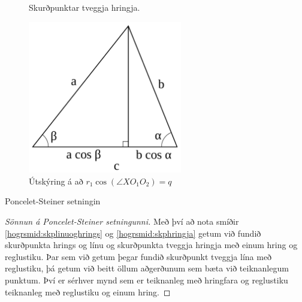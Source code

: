 \begin{frame}
  \begin{figure}[H]
    \centering
    \caption{Skurðpunktar tveggja hringja.}
    \label{fig:hogrskptveggjahringja}
  \end{figure}
\end{frame}

\begin{frame}
  \begin{figure}[H]
    \centering
    \includegraphics[width=0.6\textwidth]{AcuteAngle.png}
    \caption{Útskýring á að \(r_1 \cos{(\angle XO_1O_2)} = q \)}
    \label{fig:acuteangle}
  \end{figure}
\end{frame}

\begin{frame}{Poncelet-Steiner setningin}
  \begin{proof}[Sönnun á Poncelet-Steiner setningunni]
    Með því að nota smíðir \ref{hogrsmid:skplinuoghrings} og \ref{hogrsmid:skphringja}
    getum við fundið skurðpunkta hrings og línu og skurðpunkta
    tveggja hringja með einum hring og reglustiku. Þar sem við getum þegar
    fundið skurðpunkt tveggja lína með reglustiku, þá getum við  beitt öllum
    aðgerðunum sem bæta við teiknanlegum punktum. Því er sérhver mynd sem er
    teiknanleg með hringfara og reglustiku teiknanleg með reglustiku og einum
    hring.
\end{proof}
\end{frame}

